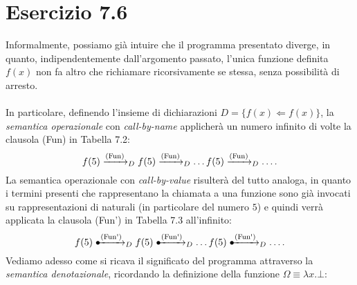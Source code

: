 \section*{Esercizio 7.6}

    
    Informalmente, possiamo già intuire che il programma presentato diverge, in quanto, indipendentemente dall'argomento passato, l'unica funzione definita $f(x)$ non fa altro che richiamare ricorsivamente se stessa, senza possibilità di arresto.\\
    \\
    In particolare, definendo l'insieme di dichiarazioni $D = \{f(x) \Leftarrow f(x)\}$, la \textit{semantica operazionale} con \textit{call-by-name} applicherà un numero infinito di volte la clausola (Fun) in Tabella 7.2:
    $$f(5) \xrightarrow{\mbox{\scriptsize(Fun)}}_D f(5) \xrightarrow{\mbox{\scriptsize(Fun)}}_D \dots f(5) \xrightarrow{\mbox{\scriptsize(Fun)}}_D \dots.$$
    La semantica operazionale con \textit{call-by-value} risulterà del tutto analoga, in quanto i termini presenti che rappresentano la chiamata a una funzione sono già invocati su rappresentazioni di naturali (in particolare del numero $5$) e quindi verrà applicata la clausola (Fun') in Tabella 7.3 all'infinito:
    $$f(5) \dotxrightarrow{\mbox{\scriptsize(Fun\textquotesingle)}}_D f(5) \dotxrightarrow{\mbox{\scriptsize(Fun\textquotesingle)}}_D \dots f(5) \dotxrightarrow{\mbox{\scriptsize(Fun\textquotesingle)}}_D \dots.$$
    Vediamo adesso come si ricava il significato del programma attraverso la \textit{semantica denotazionale}, ricordando la definizione della funzione $\Omega \equiv \lambda x.\bot$:

